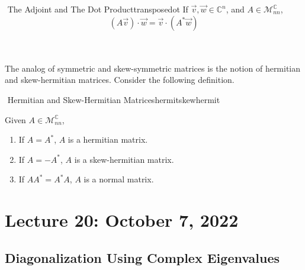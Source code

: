         \begin{theorem}{\Stop\,\,The Adjoint and The Dot Product}{transposedot}
            If \(\vec{v},\vec{w}\in\mathbb{C}^n\), and \(A\in\mathcal{M}_{nn}^\mathbb{C}\), 
            \begin{equation*}
                (A\vec{v})\cdot\vec{w}=\vec{v}\cdot(A^*\vec{w})
            \end{equation*}
        \end{theorem}
        \vphantom
        \\
        \\
        The analog of symmetric and skew-symmetric matrices is the notion of hermitian and skew-hermitian matrices. Consider the following definition.
        \begin{definition}{\Stop\,\,Hermitian and Skew-Hermitian Matrices}{hermitskewhermit}

            Given \(A\in\mathcal{M}_{nn}^\mathbb{C}\), 
            \begin{enumerate}
                \item If \(A=A^*\), \(A\) is a hermitian matrix.
                \item If  \(A=-A^*\), \(A\) is a skew-hermitian matrix.
                \item If \(AA^*=A^*A\), \(A\) is a normal matrix.
            \end{enumerate}
            
        \end{definition}

\pagebreak

\section{Lecture 20: October 7, 2022}

    \subsection{Diagonalization Using Complex Eigenvalues}

